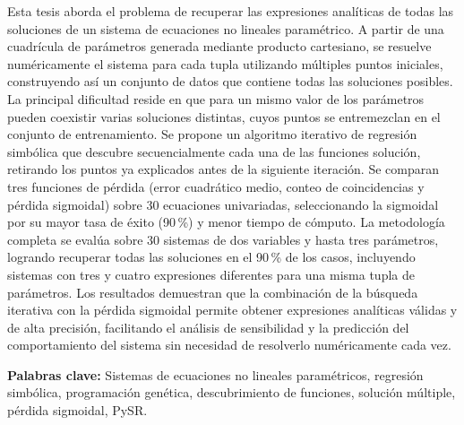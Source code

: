 \begin{resumen}
	Esta tesis aborda el problema de recuperar las expresiones analíticas de todas las soluciones de un sistema de ecuaciones no lineales paramétrico. A partir de una cuadrícula de parámetros generada mediante producto cartesiano, se resuelve numéricamente el sistema para cada tupla utilizando múltiples puntos iniciales, construyendo así un conjunto de datos que contiene todas las soluciones posibles. La principal dificultad reside en que para un mismo valor de los parámetros pueden coexistir varias soluciones distintas, cuyos puntos se entremezclan en el conjunto de entrenamiento. Se propone un algoritmo iterativo de regresión simbólica que descubre secuencialmente cada una de las funciones solución, retirando los puntos ya explicados antes de la siguiente iteración. Se comparan tres funciones de pérdida (error cuadrático medio, conteo de coincidencias y pérdida sigmoidal) sobre 30 ecuaciones univariadas, seleccionando la sigmoidal por su mayor tasa de éxito (90\,\%) y menor tiempo de cómputo. La metodología completa se evalúa sobre 30 sistemas de dos variables y hasta tres parámetros, logrando recuperar todas las soluciones en el 90\,\% de los casos, incluyendo sistemas con tres y cuatro expresiones diferentes para una misma tupla de parámetros. Los resultados demuestran que la combinación de la búsqueda iterativa con la pérdida sigmoidal permite obtener expresiones analíticas válidas y de alta precisión, facilitando el análisis de sensibilidad y la predicción del comportamiento del sistema sin necesidad de resolverlo numéricamente cada vez.

	


	\textbf{Palabras clave:} Sistemas de ecuaciones no lineales paramétricos, regresión simbólica, programación genética, descubrimiento de funciones, solución múltiple, pérdida sigmoidal, PySR.
\end{resumen}


